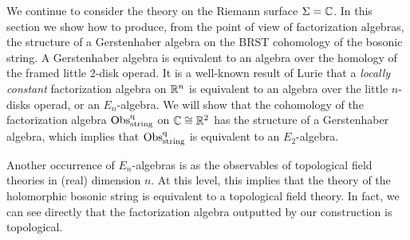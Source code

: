 We continue to consider the theory on the Riemann surface $\Sigma = \mathbb C$. 
In this section we show how to produce, from the point of view of factorization algebras, the structure of a Gerstenhaber algebra on the BRST cohomology of the bosonic string. 
A Gerstenhaber algebra is equivalent to an algebra over the homology of the framed little 2-disk operad. 
It is a well-known result of Lurie \cite{Lurie} that a {\em locally constant} factorization algebra on $\mathbb R^n$ is equivalent to an algebra over the little $n$-disks operad, or an $E_n$-algebra. 
We will show that the cohomology of the factorization algebra ${\rm Obs}^{{\rm q}}_{\rm string}$ on $\mathbb C \cong \mathbb R^2$ has the structure of a Gerstenhaber algebra, which implies that ${\rm Obs}^{\rm q}_{\rm string}$ is equivalent to an $E_2$-algebra. 

Another occurrence of $E_n$-algebras is as the observables of topological field theories in (real) dimension $n$. 
At this level, this implies that the theory of the holomorphic bosonic string is equivalent to a topological field theory. 
In fact, we can see directly that the factorization algebra outputted by our construction is topological. 


